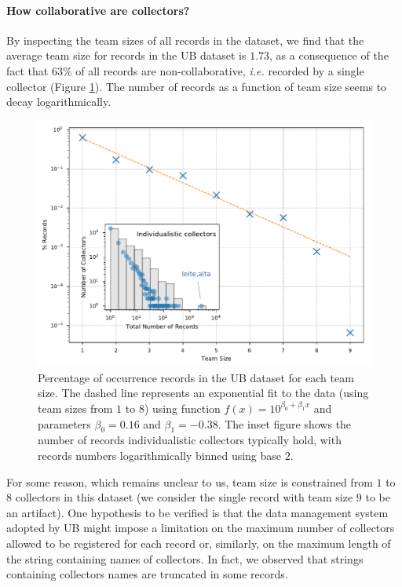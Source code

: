 \paragraph{How collaborative are collectors?}

By inspecting the team sizes of all records in the dataset, we find that the average team size for records in the UB dataset is $1.73$, as a consequence of the fact that $63\%$ of all records are non-collaborative, \textit{i.e.} recorded by a single collector (Figure \ref{fig:ub_team_sizes}).
The number of records as a function of team size seems to decay logarithmically.
\begin{figure}[!ht]
  	\centering
    \includegraphics[width=0.9\linewidth]{figures/casestudy_ub/team_sizes.pdf}
    \caption[Percentage of occurrence records in the UB dataset for each team size.]{ Percentage of occurrence records in the UB dataset for each team size. The dashed line represents an exponential fit to the data (using team sizes from $1$ to $8$) using function $f(x) = 10^{\beta_0 + \beta_1 x}$ and parameters $\beta_0=0.16$ and $\beta_1=-0.38$. The inset figure shows the number of records individualistic collectors typically hold, with records numbers logarithmically binned using base $2$. }
    \label{fig:ub_team_sizes}
\end{figure}
%
For some reason, which remains unclear to us, team size is constrained from $1$ to $8$ collectors in this dataset (we consider the single record with team size $9$ to be an artifact).
One hypothesis to be verified is that the data management system adopted by UB might impose a limitation on the maximum number of collectors allowed to be registered for each record or, similarly, on the maximum length of the string containing names of collectors. 
In fact, we observed that strings containing collectors names are truncated in some records.

